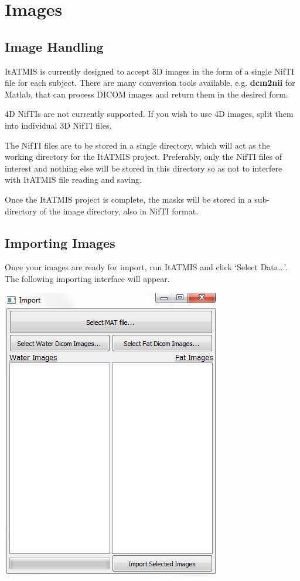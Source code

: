 \documentclass[twoside,a4paper]{refart}
\begin{document}
\newpage
\section{Images}

\subsection{Image Handling}


ItATMIS is currently designed to accept 3D images in the form of a single NifTI file for each subject. There are many conversion tools available, e.g. \textbf{dcm2nii} for Matlab, that can process DICOM images and return them in the desired form.

4D NifTIs are not currently supported. If you wish to use 4D images, split them into individual 3D NifTI files.

The NifTI files are to be stored in a single directory, which will act as the working directory for the ItATMIS project. Preferably, only the NifTI files of interest and nothing else will be stored in this directory so as not to interfere with ItATMIS file reading and saving.

Once the ItATMIS project is complete, the masks will be stored in a sub-directory of the image directory, also in NifTI format.


\subsection{Importing Images}

Once your images are ready for import, run ItATMIS and click `Select Data...'. The following importing interface will appear.

\hspace{2cm}
\includegraphics[width=.6\textwidth]{ImportGUI.PNG}
\end{document}
